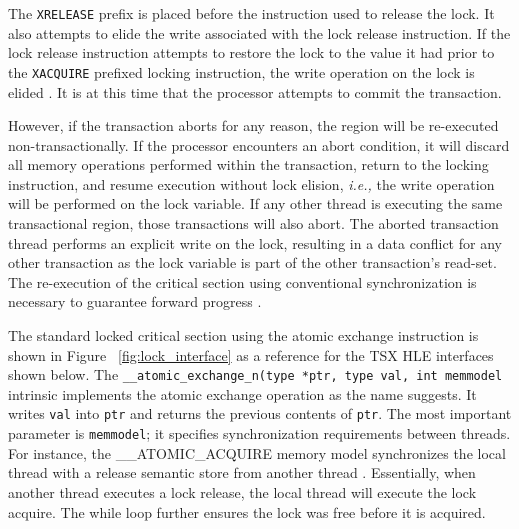 \documentclass[11pt]{book}
\begin{document}
The \texttt{XRELEASE} prefix is placed before the instruction used to release the lock.
It also attempts to elide the write associated with the lock release instruction.  If the
lock release instruction attempts to restore the lock to the value it had prior to the
\texttt{XACQUIRE} prefixed locking instruction, the write operation on the lock is elided
\cite{intel_prog_ref}.  It is at this time that the processor attempts to commit the
transaction.

However, if the transaction aborts for any reason, the region will be re-executed
non-transactionally.  If the processor encounters an abort condition, it will discard all
memory operations performed within the transaction, return to the locking instruction, and
resume execution without lock elision, \emph{i.e.,} the write operation will be performed on the
lock variable.  If any other thread is executing the same transactional region,
those transactions will also abort.  The aborted transaction thread performs an
explicit write on the lock, resulting in a data conflict for any other
transaction as the lock variable is part of the other transaction's read-set.
The re-execution of the critical section using conventional synchronization is
necessary to guarantee forward progress \cite{intel_prog_ref}.


The standard locked critical section using the atomic exchange instruction is
shown in Figure ~\ref{fig:lock_interface} as a reference for the TSX HLE
interfaces shown below.  The \texttt{\_\_atomic\_exchange\_n(type *ptr, type
val, int memmodel} intrinsic implements the atomic exchange operation as the
name suggests.  It writes \texttt{val} into \texttt{ptr} and returns the
previous contents of \texttt{ptr}.  The most important parameter is
\texttt{memmodel}; it specifies synchronization requirements between threads.
For instance, the \_\_ATOMIC\_ACQUIRE memory model synchronizes the local thread
with a release semantic store from another thread \cite{gcc}.  Essentially, when
another thread executes a lock release, the local thread will execute the lock
acquire.  The while loop further ensures the lock was free before it is acquired.
\end{document}
